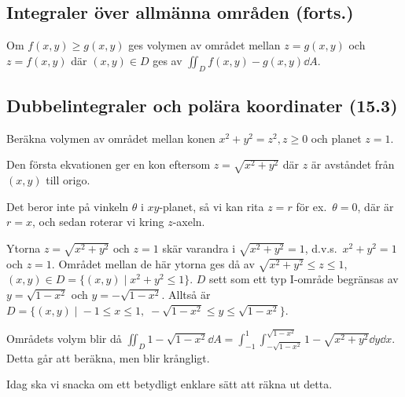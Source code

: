 \documentclass[a4paper]{article}
\begin{document}
\providecommand\fname{}
\renewcommand\fname{19-09-27}

\subsection{Integraler över allmänna områden (forts.)}
\begin{sats}
    Om \(
        f(x,y) \geq g(x,y) 
    \) ges volymen av området mellan \(
        z = g(x,y)
    \) och \(
        z = f(x,y)
    \) där \(
        (x,y) \in D
    \) ges av \(
        \iint_D f(x,y) - g(x,y) \dd A 
    \).
\end{sats}

\subsection{Dubbelintegraler och polära koordinater (15.3)}
\begin{ex}
    Beräkna volymen av området mellan konen \(
        x^2+y^2 = z^2, z \geq 0
    \) och planet \(
        z = 1
    \).

    Den första ekvationen ger en kon eftersom \(
        z = \sqrt{x^2+y^2}
    \) där \(
        z
    \) är avståndet från \(
        (x,y)
    \) till origo. 

    Det beror inte på vinkeln \(
        \theta
    \) i \(
        xy
    \)-planet, så vi kan rita \(
        z = r
    \) för ex.\ \(
        \theta = 0
    \), där är \(
        r = x
    \), och sedan roterar vi kring \(
        z
    \)-axeln.

    Ytorna \(
        z = \sqrt{x^2+y^2}
    \) och \(
        z = 1
    \) skär varandra i \(
        \sqrt{x^2+y^2} = 1
    \), d.v.s.\ \(
        x^2+y^2 = 1
    \) och \(
        z = 1
    \). Området mellan de här ytorna ges då av \(
        \sqrt{x^2+y^2} \leq z \leq 1
    \), \(
        (x,y) \in D = \{(x,y)\; |\; x^2+y^2 \leq 1\}
    \). \(
        D
    \) sett som ett typ I-område begränsas av \(
        y = \sqrt{1-x^2}
    \) och \(
        y = -\sqrt{1-x^2}
    \). Alltså är \(
        D = \{(x,y)\; |\; -1 \leq x \leq 1,\; -\sqrt{1-x^2} \leq y \leq \sqrt{1-x^2}\}
    \). 

    Områdets volym blir då \(
        \iint_D 1-\sqrt{1-x^2} \dd A 
        = \int_{-1}^1 \int_{-\sqrt{1-x^2}}^{\sqrt{1-x^2}} 1-\sqrt{x^2+y^2} \dd y \dd x
    \). Detta går att beräkna, men blir krångligt.
\end{ex}

Idag ska vi snacka om ett betydligt enklare sätt att räkna ut detta.
\end{document}
